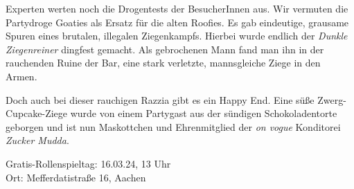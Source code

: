 \documentclass[final]{multiversum}
\begin{document}
Experten werten noch die Drogentests der BesucherInnen aus. Wir vermuten die
Partydroge Goaties als Ersatz für die alten Roofies. Es gab eindeutige, grausame
Spuren eines brutalen, illegalen Ziegenkampfs. Hierbei wurde endlich der
\emph{Dunkle Ziegenreiner} dingfest gemacht. Als gebrochenen Mann fand man ihn
in der rauchenden Ruine der Bar, eine stark verletzte, mannsgleiche Ziege in den
Armen.

Doch auch bei dieser rauchigen Razzia gibt es ein Happy End. Eine süße
Zwerg-Cupcake-Ziege wurde von einem Partygast aus der sündigen Schokoladentorte
geborgen und ist nun Maskottchen und Ehrenmitglied der \emph{on vogue}
Konditorei \emph{Zucker Mudda}.


\begin{termine}
\item Gratis-Rollenspieltag: 16.03.24, 13 Uhr\\
Ort: Mefferdatistraße 16, Aachen
\end{termine}
\impressum
\end{document}
